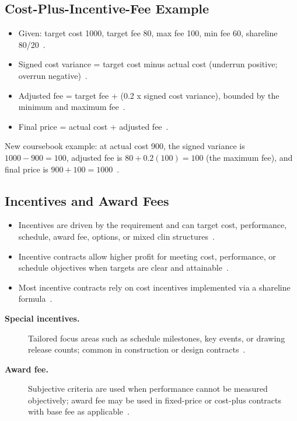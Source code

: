 \documentclass[../main.tex]{subfiles}
\begin{document}
\subsection{Cost-Plus-Incentive-Fee Example}
\begin{itemize}
  \item Given: target cost 1000, target fee 80, max fee 100, min fee 60, shareline 80/20~\autocite{edo-3-2-2-solicitation-prep-2025}.
  \item Signed cost variance = target cost minus actual cost (underrun positive; overrun negative)~\autocite{edo-3-2-2-solicitation-prep-2025}.
  \item Adjusted fee = target fee + (0.2 x signed cost variance), bounded by the minimum and maximum fee~\autocite{edo-3-2-2-solicitation-prep-2025}.
  \item Final price = actual cost + adjusted fee~\autocite{edo-3-2-2-solicitation-prep-2025}.
\end{itemize}

\noindent New coursebook example: at actual cost 900, the signed variance is $1000-900=100$, adjusted fee is $80+0.2(100)=100$ (the maximum fee), and final price is $900+100=1000$~\autocite{edo-3-2-2-solicitation-prep-2025,FAR-16-405-1-CPIF}.

\subsection{Incentives and Award Fees}
\begin{itemize}
  \item Incentives are driven by the requirement and can target cost, performance, schedule, award fee, options, or mixed \ac{clin} structures~\autocite{edo-3-2-2-solicitation-prep-2025,FAR-16-401-Incentive-Contracts}.
  \item Incentive contracts allow higher profit for meeting cost, performance, or schedule objectives when targets are clear and attainable~\autocite{edo-3-2-2-solicitation-prep-2025,FAR-16-401-Incentive-Contracts}.
  \item Most incentive contracts rely on cost incentives implemented via a shareline formula~\autocite{edo-3-2-2-solicitation-prep-2025,FAR-16-401-Incentive-Contracts}.
\end{itemize}
\begin{description}
  \item[\textbf{Special incentives.}] Tailored focus areas such as schedule milestones, key events, or drawing release counts; common in construction or design contracts~\autocite{edo-3-2-2-solicitation-prep-2025}.
  \item[\textbf{Award fee.}] Subjective criteria are used when performance cannot be measured objectively; award fee may be used in fixed-price or cost-plus contracts with base fee as applicable~\autocite{edo-3-2-2-solicitation-prep-2025}.
\end{description}
\end{document}
